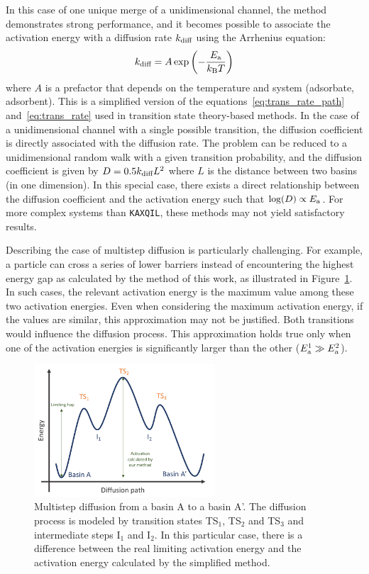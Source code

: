 \documentclass[main]{subfiles}
\begin{document}
In this case of one unique merge of a unidimensional channel, the method demonstrates strong performance, and it becomes possible to associate the activation energy with a diffusion rate $k_{\text{diff}}$ using the Arrhenius equation:
\begin{equation}
  k_{\text{diff}} = A \exp\left(-\frac{E_{\text{a}}}{k_{\text{B}}T}\right)
\end{equation}
where $A$ is a prefactor that depends on the temperature and system (adsorbate, adsorbent). This is a simplified version of the equations~\ref{eq:trans_rate_path} and~\ref{eq:trans_rate} used in transition state theory-based methods. In the case of a unidimensional channel with a single possible transition, the diffusion coefficient is directly associated with the diffusion rate. The problem can be reduced to a unidimensional random walk with a given transition probability, and the diffusion coefficient is given by $D=0.5k_{\text{diff}}L^2$ where $L$ is the distance between two basins (in one dimension). In this special case, there exists a direct relationship between the diffusion coefficient and the activation energy such that $\log(D)\propto E_{\text{a}}$. For more complex systems than \texttt{KAXQIL}, these methods may not yield satisfactory results. 

Describing the case of multistep diffusion is particularly challenging. For example, a particle can cross a series of lower barriers instead of encountering the highest energy gap as calculated by the method of this work, as illustrated in Figure~\ref{fgr:TS_problem}. In such cases, the relevant activation energy is the maximum value among these two activation energies. Even when considering the maximum activation energy, if the values are similar, this approximation may not be justified. Both transitions would influence the diffusion process. This approximation holds true only when one of the activation energies is significantly larger than the other ($E_{\text{a}}^1 \gg E_{\text{a}}^2$).

\begin{figure}[ht]
  \centering
    \includegraphics[width=0.6\textwidth]{figures/5-diffusion/Diffusion_TS.pdf}
    \caption{Multistep diffusion from a basin A to a basin A'. The diffusion process is modeled by transition states TS$_1$, TS$_2$ and TS$_3$ and intermediate steps I$_1$ and I$_2$. In this particular case, there is a difference between the real limiting activation energy and the activation energy calculated by the simplified method. }\label{fgr:TS_problem}
\end{figure}
\end{document}
